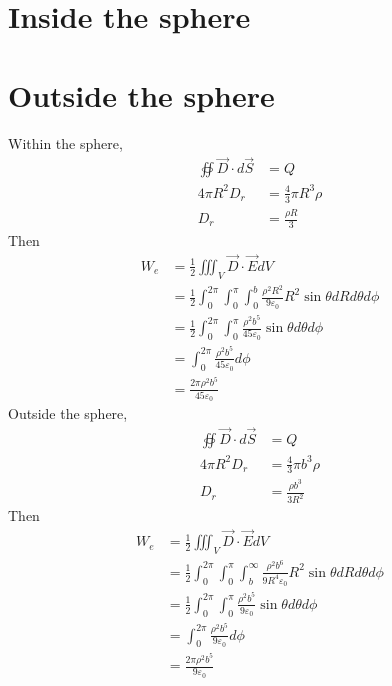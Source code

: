 \documentclass[answers]{exam}
\begin{document}
\begin{questions}

\begin{parts}
	\part{Inside the sphere}
	\part{Outside the sphere}
\end{parts}

\begin{solution}
	Within the sphere,
	\begin{align*}
		\oiint \vec{D} \cdot d\vec{S} &= Q \\
		4\pi R^2 D_r &= \frac{4}{3}\pi R^3\rho \\
		D_r &= \frac{\rho R}{3}
	\end{align*}
	Then
	\begin{align*}
		W_e &= \frac{1}{2} \iiint_V \vec{D} \cdot \vec{E} dV \\
		    &= \frac{1}{2} \int_0^{2\pi} \int_0^\pi \int_0^b \frac{\rho^2 R^2}{9\varepsilon_0} R^2 \sin\theta dR d\theta d\phi \\
		    &= \frac{1}{2} \int_0^{2\pi} \int_0^\pi \frac{\rho^2b^5}{45\varepsilon_0} \sin\theta d\theta d\phi \\
		    &= \int_0^{2\pi} \frac{\rho^2b^5}{45\varepsilon_0} d\phi \\
		    &= \frac{2\pi \rho^2b^5}{45\varepsilon_0}
	\end{align*}
	Outside the sphere,
	\begin{align*}
		\oiint \vec{D} \cdot d\vec{S} &= Q \\
		4\pi R^2 D_r &= \frac{4}{3} \pi b^3\rho \\
		D_r &= \frac{\rho b^3}{3R^2}
	\end{align*}
	Then 
	\begin{align*}
		W_e &= \frac{1}{2} \iiint_V \vec{D} \cdot \vec{E} dV \\
		    &= \frac{1}{2} \int_0^{2\pi} \int_0^\pi \int_b^\infty \frac{\rho^2b^6}{9R^4\varepsilon_0} R^2 \sin\theta dR d\theta d\phi \\
		    &= \frac{1}{2} \int_0^{2\pi} \int_0^\pi \frac{\rho^2b^5}{9\varepsilon_0} \sin\theta d\theta d\phi \\
		    &= \int_0^{2\pi} \frac{\rho^2b^5}{9\varepsilon_0} d\phi \\
		    &= \frac{2\pi \rho^2b^5}{9\varepsilon_0}
	\end{align*}
\end{solution}


\end{questions}
\end{document}
